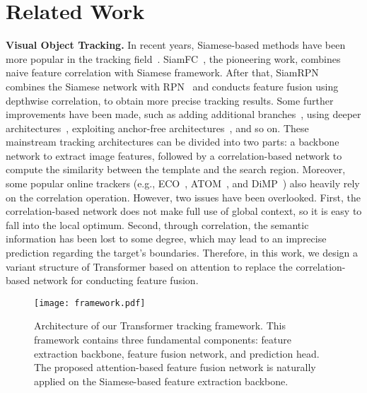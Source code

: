 \documentclass[final]{cvpr}
\begin{document}
\section{Related Work}
{\noindent \textbf{Visual Object Tracking.}}
In recent years, Siamese-based methods have been more popular in the tracking field~\cite{SINT,SiameseFC,SiameseRPN,SiamMask,SiamRPNplusplus,SiamFC++,Ocean}. 
SiamFC~\cite{SiameseFC}, the pioneering work, combines naive feature correlation with Siamese framework. 
After that, SiamRPN~\cite{SiameseRPN} combines the Siamese network with RPN~\cite{FasterRCNN} and conducts feature fusion using 
depthwise correlation, to obtain more precise tracking results. 
Some further improvements have been made, such as adding additional branches~\cite{SiamMask,Alpha-Refine}, using deeper architectures~\cite{SiamRPNplusplus}, 
exploiting anchor-free architectures~\cite{SiamFC++,Ocean}, and so on. 
These mainstream tracking architectures can be divided into two parts: a backbone network to extract image features, 
followed by a correlation-based network to compute the similarity between the template and the search region. 
Moreover, some popular online trackers (e.g., ECO~\cite{ECO}, ATOM~\cite{ATOM}, and DiMP~\cite{DiMP}) also heavily rely on the correlation 
operation. 
However, two issues have been overlooked. First, the correlation-based network does not make full use of global context, so it is easy to fall into the local optimum. Second, through correlation, the semantic information has been lost to some degree, which 
may lead to an imprecise prediction regarding the target's boundaries. 
Therefore, in this work, we design a variant structure of Transformer based on attention to replace the correlation-based network 
for conducting feature fusion. 



\begin{figure*}[!t]
\begin{center}
\texttt{[image: framework.pdf]}
\end{center}
   \caption{Architecture of our Transformer tracking framework. This framework contains three fundamental components: 
   feature extraction backbone, feature fusion network, and prediction head. The proposed attention-based feature fusion 
   network is naturally applied on the Siamese-based feature extraction backbone.}
\label{fig:TransT}
\end{figure*}
\end{document}
